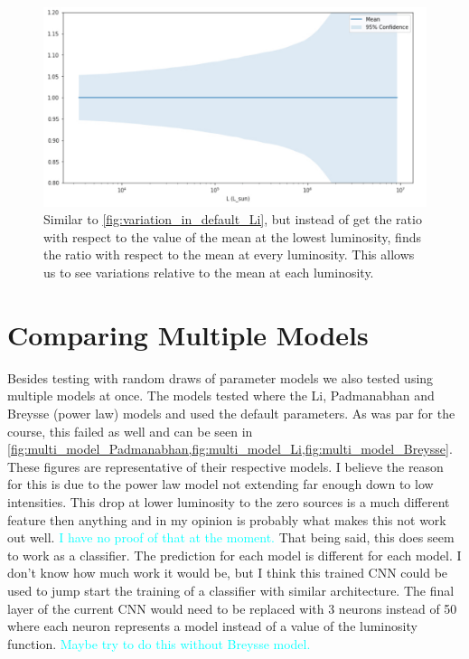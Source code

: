 \documentclass{article}
\newcommand{\dnp}[1]{\textcolor{cyan}{#1}}
\begin{document}
		\begin{figure}[H]
			\centering
			\includegraphics[width=1.0\textwidth]{variation_in_default_Li_local.pdf}
			\caption{Similar to \cref{fig:variation_in_default_Li}, but instead of get the ratio with respect to the value of the mean at the lowest luminosity, finds the ratio with respect to the mean at every luminosity.  This allows us to see variations relative to the mean at each luminosity.}
			\label{fig:variation_in_default_Li_local}
		\end{figure}

	\section{Comparing Multiple Models} \label{sec:mult}
		Besides testing with random draws of parameter models we also tested using multiple models at once.  The models tested where the Li, Padmanabhan and Breysse (power law) models and used the default parameters.  As was par for the course, this failed as well and can be seen in \cref{fig:multi_model_Padmanabhan,fig:multi_model_Li,fig:multi_model_Breysse}.  These figures are representative of their respective models.  I believe the reason for this is due to the power law model not extending far enough down to low intensities.  This drop at lower luminosity to the zero sources is a much different feature then anything and in my opinion is probably what makes this not work out well.  \dnp{I have no proof of that at the moment.}  That being said, this does seem to work as a classifier.  The prediction for each model is different for each model.  I don't know how much work it would be, but I think this trained CNN could be used to jump start the training of a classifier with similar architecture.  The final layer of the current CNN would need to be replaced with 3 neurons instead of 50 where each neuron represents a model instead of a value of the luminosity function.  \dnp{Maybe try to do this without Breysse model.}
\end{document}
